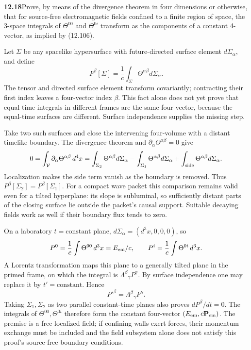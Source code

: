 \par\bigskip
\noindent\textbf{12.18}\quad Prove, by means of the divergence theorem in four dimensions or otherwise, that for source-free electromagnetic fields confined to a finite region of space, the 3-space integrals of $\Theta^{00}$ and $\Theta^{0i}$ transform as the components of a constant 4-vector, as implied by (12.106).
\solution

Let $\Sigma$ be any spacelike hypersurface with future-directed
surface element $d\Sigma_\alpha$, and define
\[
P^\beta[\Sigma]=\frac1c\int_\Sigma
 \Theta^{\alpha\beta}d\Sigma_\alpha.
\]
The tensor and directed surface element transform covariantly;
contracting their first index leaves a four-vector index $\beta$.
This fact alone does not yet prove that equal-time integrals in
different frames are the same four-vector, because the equal-time
surfaces are different.  Surface independence supplies the missing step.

Take two such surfaces and close the intervening four-volume with
a distant timelike boundary.  The divergence theorem and
$\partial_\alpha\Theta^{\alpha\beta}=0$ give
\[
0=\int_{\mathcal V}\partial_\alpha\Theta^{\alpha\beta}\,d^4x
=\int_{\Sigma_2}\Theta^{\alpha\beta}d\Sigma_\alpha
-\int_{\Sigma_1}\Theta^{\alpha\beta}d\Sigma_\alpha
+\int_{\rm side}\Theta^{\alpha\beta}d\Sigma_\alpha.
\]
Localization makes the side term vanish as the boundary is removed.
Thus $P^\beta[\Sigma_2]=P^\beta[\Sigma_1]$.
For a compact wave packet this comparison remains valid even for
a tilted hyperplane: its slope is subluminal, so sufficiently distant
parts of the closing surface lie outside the packet's causal support.
Suitable decaying fields work as well if their boundary flux tends to zero.

On a laboratory $t=\mathrm{constant}$ plane,
$d\Sigma_\alpha=(d^3x,0,0,0)$, so
\[
P^0=\frac1c\int\Theta^{00}\,d^3x=E_{\rm em}/c,\qquad
P^i=\frac1c\int\Theta^{0i}\,d^3x.
\]
A Lorentz transformation maps this plane to a generally tilted
plane in the primed frame, on which the integral is
$\Lambda^\beta{}_{\gamma}P^\gamma$.  By surface independence
one may replace it by $t'=\mathrm{constant}$.  Hence
\[
\boxed{P'^\beta=\Lambda^\beta{}_{\gamma}P^\gamma.}
\]
Taking $\Sigma_1,\Sigma_2$ as two parallel constant-time planes
also proves $dP^\beta/dt=0$.  The integrals of
$\Theta^{00},\Theta^{0i}$ therefore form the constant four-vector
$(E_{\rm em},c\mathbf P_{\rm em})$.
The premise is a free localized field; if confining walls exert
forces, their momentum exchange must be included and the field
subsystem alone does not satisfy this proof's source-free boundary
conditions.

